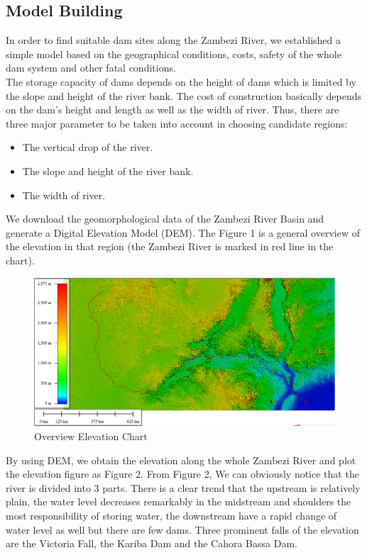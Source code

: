 \documentclass{mcmthesis}
\begin{document}
\subsection{Model Building}
\indent \indent In order to find suitable dam sites along the Zambezi River, we established a simple model based on the geographical conditions, costs, safety of the whole dam system and other fatal conditions. \\
\indent The storage capacity of dams depends on the height of dams which is limited by the slope and height of the river bank. The cost of construction basically depends on the dam's height and length as well as the width of river. Thus, there are three major parameter to be taken into account in choosing candidate regions:
\begin{itemize}
\item The vertical drop of the river.
\item The slope and height of the river bank.
\item The width of river.
\end{itemize}

We download the geomorphological data of the Zambezi River Basin and generate a Digital Elevation Model (DEM). The Figure 1 is a general overview of the elevation in that region (the Zambezi River is marked in red line in the chart).

\begin{figure}[h]
\small
\centering
\includegraphics[width=14cm]{./figures/Sensing_Figure.png}
\caption{Overview Elevation Chart} \label{fig:Fig1}
\end{figure}

By using DEM, we obtain the elevation along the whole Zambezi River and plot the elevation figure as Figure 2. From Figure 2, We can obviously notice that the river is divided into 3 parts. There is a clear trend that the upstream is relatively plain, the water level decreases remarkably in the midstream and shoulders the most responsibility of storing water, the downstream have a rapid change of water level as well but there are few dams. Three prominent falls of the elevation are the Victoria Fall, the Kariba Dam and the Cahora Bassa Dam.
\end{document}
